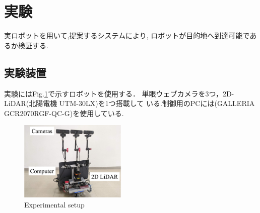 \documentclass{sice-si}
\begin{document}
\section{実験}
実ロボットを用いて,提案するシステムにより,
ロボットが目的地へ到達可能であるか検証する.
\subsection{実験装置}
実験にはFig.\ref{fig:gamma}で示すロボットを使用する．
単眼ウェブカメラを3つ，2D-LiDAR(北陽電機 UTM-30LX)を1つ搭載して
いる.制御用のPCには(GALLERIA GCR2070RGF-QC-G)を使用している.
\begin{figure}[htbp]
    \centering
     \includegraphics[height=38mm]{./figs/gamma_sensor.png}
     \caption{Experimental setup}\label{fig:gamma}
\end{figure}
\end{document}

